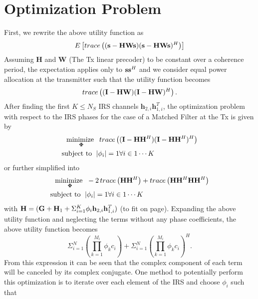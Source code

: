 \documentclass[12pt,a4paper]{report}
\begin{document}
\section{Optimization Problem}
First, we rewrite the above utility function as
	\begin{equation}
E\left[ \mathop{trace}\left((\mathbf{s} - \mathbf{H}\mathbf{W}\mathbf{s})(\mathbf{s} - \mathbf{H}\mathbf{W}\mathbf{s})^H \right)\right]
\end{equation}
Assuming $\mathbf{H}$ and $\mathbf{W}$ (The Tx linear precoder) to be constant over a coherence period, the expectation applies only to $\mathbf{s} \mathbf{s}^H$ 
and we consider equal power allocation at the transmitter such that the utility function becomes
	\begin{equation}
\mathop{trace}\left((\mathbf{I} - \mathbf{H}\mathbf{W})(\mathbf{I} - \mathbf{H}\mathbf{W})^H \right).
\end{equation}
After finding the first $K \leq N_S$ IRS channels $\mathbf{h}_{2,i}\mathbf{h}^T_{1,i}$, the optimization problem with respect to the IRS phases for the case of a Matched Filter at the Tx is given by
	\begin{align}
	    \underset{\boldsymbol{\Phi}}{\text{minimize }}
	    & \; \mathop{trace}\left((\mathbf{I} - \mathbf{H}\mathbf{H}^H)
	   (\mathbf{I} - \mathbf{H}\mathbf{H}^H)^H \right)
	     \\
	    \text{subject to  } \; &
	    | \phi_i | = 1  \forall i \in {1 \cdots	 K}
	\end{align}\label{mse_problem}
	or further simplified into
		\begin{align}
	    \underset{\boldsymbol{\Phi}}{\text{minimize }}
	    & \; - 2 \mathop{trace} \left( \mathbf{H}\mathbf{H}^H\right) + \mathop{trace}\left(\mathbf{H}\mathbf{H}^H \mathbf{H}\mathbf{H}^H\right)
	     \\
	    \text{subject to  } \; &
	    | \phi_i | = 1  \forall i \in {1 \cdots	 K}
	\end{align}\label{mse_problem_s}
	with $\mathbf{H} = (\mathbf{G} +  \mathbf{H}_1 + \Sigma_{i=1}^{K} \phi_i \mathbf{h}_{2,i}\mathbf{h}^T_{1,i})$ (to fit on page).
	Expanding the above utility function and neglecting the terms without any phase coefficients, the above utility function becomes
	\begin{equation}
	\Sigma_{i=1}^{N} \left(\prod_{k=1}^{M_i}\phi_{k} c_i \right ) +  \Sigma_{i=1}^{N} \left(\prod_{k=1}^{M_i}\phi_{k} c_i \right)^H.
	\end{equation}
	From this expression it can be seen that the complex component of each term will be canceled by its complex conjugate.
	One method to potentially perform this optimization is to iterate over each element of the IRS and choose $\phi_{i}$ such that 
\end{document}
